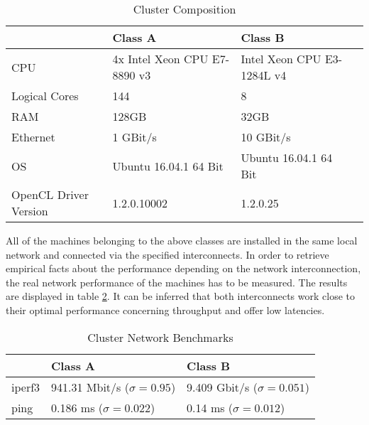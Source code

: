 \begin{table}[htb]
	\centering
	\begin{adjustbox}{width=0.7\textwidth}
		\small
		\begin{tabular}{l | l | l | l}
			~                     & Class A                  	& Class B                  \\
			\hline
			CPU                   &  4x Intel Xeon CPU E7-8890 v3 	& Intel Xeon CPU E3-1284L v4 \\
			Logical Cores         &  144 	& 8 \\
			RAM                   &  128GB                       	& 32GB                       \\
			Ethernet	          &  1 GBit/s                  	& 10 GBit/s                  \\
			OS                    &  Ubuntu 16.04.1 64 Bit      	& Ubuntu 16.04.1 64 Bit      \\
			OpenCL Driver Version &  1.2.0.10002                   & 1.2.0.25                   \\
		\end{tabular}
	\end{adjustbox}
	
	\caption{Cluster Composition}
	\label{table:cluster_setup_1}
\end{table}

All of the machines belonging to the above classes are installed in the same local network and connected via the specified interconnects. In order to retrieve empirical facts about the performance depending on the network interconnection, the real network performance of the machines has to be measured. The results are displayed in table \ref{table:cluster_interconnect_benchmarks}. It can be inferred that both interconnects work close to their optimal performance concerning throughput and offer low latencies.

\begin{table}[!htb]
	\centering
	\begin{adjustbox}{width=0.5\textwidth}
		\small
		\begin{tabular}{l | l | l}
			~                     & Class A                 			& Class B                  \\
			\hline
			iperf3                & 941.31 Mbit/s ($\sigma = 0.95$) 	& 9.409 Gbit/s ($\sigma = 0.051$) \\
			ping                  & 0.186 ms ($\sigma = 0.022$)  		& 0.14 ms ($\sigma = 0.012$)  \\
		\end{tabular}
	\end{adjustbox}
	
	\caption{Cluster Network Benchmarks}
	\label{table:cluster_interconnect_benchmarks}
\end{table}

